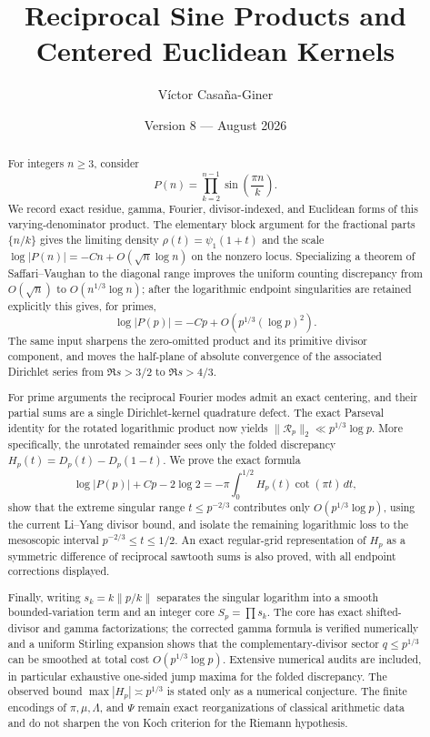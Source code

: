\documentclass[11pt]{amsart}
\title{Reciprocal Sine Products and Centered Euclidean Kernels}
\author{V\'ictor Casa\~na-Giner}
\date{Version 8 --- August 2026}
\numberwithin{equation}{section}
\theoremstyle{definition}
\theoremstyle{remark}
\begin{document}
\begin{abstract}
For integers \(n\geq3\), consider
\[
 P(n)=\prod_{k=2}^{n-1}\sin\!\left(\frac{\pi n}{k}\right).
\]
We record exact residue, gamma, Fourier, divisor-indexed, and Euclidean
forms of this varying-denominator product.  The elementary block argument
for the fractional parts \(\{n/k\}\) gives the limiting density
\(\rho(t)=\psi_1(1+t)\) and the scale
\(\log|P(n)|=-Cn+O(\sqrt n\log n)\) on the nonzero locus.  Specializing
a theorem of Saffari--Vaughan to the diagonal range improves the uniform
counting discrepancy from \(O(\sqrt n)\) to
\(O(n^{1/3}\log n)\); after the logarithmic endpoint singularities are
retained explicitly this gives, for primes,
\[
 \log|P(p)|=-Cp+O\!\left(p^{1/3}(\log p)^2\right).
\]
The same input sharpens the zero-omitted product and its primitive divisor
component, and moves the half-plane of absolute convergence of the
associated Dirichlet series from \(\Re s>3/2\) to \(\Re s>4/3\).

For prime arguments the reciprocal Fourier modes admit an exact centering,
and their partial sums are a single Dirichlet-kernel quadrature defect.
The exact Parseval identity for the rotated logarithmic product now yields
\(\|\mathscr R_p\|_2\ll p^{1/3}\log p\).  More specifically, the
unrotated remainder sees only the folded discrepancy
\(H_p(t)=D_p(t)-D_p(1-t)\).  We prove the exact formula
\[
 \log|P(p)|+Cp-2\log2
 =-\pi\int_0^{1/2}H_p(t)\cot(\pi t)\,dt,
\]
show that the extreme singular range \(t\le p^{-2/3}\) contributes only
\(O(p^{1/3}\log p)\), using the current Li--Yang divisor bound, and isolate
the remaining logarithmic loss to the mesoscopic interval
\(p^{-2/3}\le t\le1/2\).  An exact regular-grid representation of
\(H_p\) as a symmetric difference of reciprocal sawtooth sums is also
proved, with all endpoint corrections displayed.

Finally, writing \(s_k=k\|p/k\|\) separates the singular logarithm into a
smooth bounded-variation term and an integer core \(S_p=\prod s_k\).  The
core has exact shifted-divisor and gamma factorizations; the corrected
gamma formula is verified numerically and a uniform Stirling expansion
shows that the complementary-divisor sector \(q\le p^{1/3}\) can be
smoothed at total cost \(O(p^{1/3}\log p)\).  Extensive numerical audits
are included, in particular exhaustive one-sided jump maxima for the
folded discrepancy.  The observed bound \(\max|H_p|\asymp p^{1/3}\) is
stated only as a numerical conjecture.  The finite encodings of
\(\pi,\mu,\Lambda\), and \(\Psi\) remain exact reorganizations of classical
arithmetic data and do not sharpen the von Koch criterion for the Riemann
hypothesis.
\end{abstract}
\end{document}
